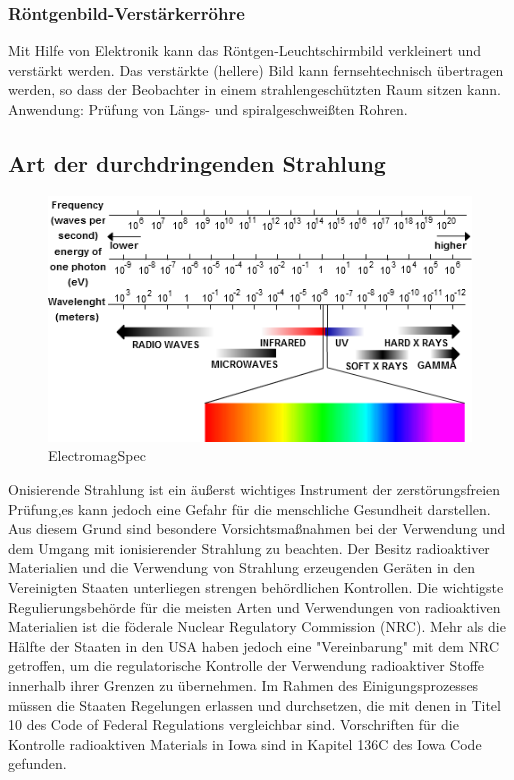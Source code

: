 \subsubsection{Röntgenbild-Verstärkerröhre}
Mit Hilfe von Elektronik kann das Röntgen-Leuchtschirmbild verkleinert und verstärkt werden. Das verstärkte (hellere) Bild kann fernsehtechnisch übertragen werden, so dass der Beobachter in einem strahlengeschützten Raum sitzen kann.
Anwendung: Prüfung von Längs- und spiralgeschweißten Rohren.\\
\subsection{Art der durchdringenden Strahlung}
\begin{figure}[htb]
  \centering  
  \includegraphics[scale=0.7]{img/ElectromagSpec.png}
  \caption{ElectromagSpec}
  \label{fig:ElectromagSpec}
\end{figure}
Onisierende Strahlung ist ein äußerst wichtiges Instrument der zerstörungsfreien Prüfung,es kann jedoch eine Gefahr für die menschliche Gesundheit darstellen. Aus diesem Grund sind besondere Vorsichtsmaßnahmen bei der Verwendung und dem Umgang mit ionisierender Strahlung zu beachten. Der Besitz radioaktiver Materialien und die Verwendung von Strahlung erzeugenden Geräten in den Vereinigten Staaten unterliegen strengen behördlichen Kontrollen. Die wichtigste Regulierungsbehörde für die meisten Arten und Verwendungen von radioaktiven Materialien ist die föderale Nuclear Regulatory Commission (NRC). Mehr als die Hälfte der Staaten in den USA haben jedoch eine "Vereinbarung" mit dem NRC getroffen, um die regulatorische Kontrolle der Verwendung radioaktiver Stoffe innerhalb ihrer Grenzen zu übernehmen. Im Rahmen des Einigungsprozesses müssen die Staaten Regelungen erlassen und durchsetzen, die mit denen in Titel 10 des Code of Federal Regulations vergleichbar sind. Vorschriften für die Kontrolle radioaktiven Materials in Iowa sind in Kapitel 136C des Iowa Code gefunden.\\
